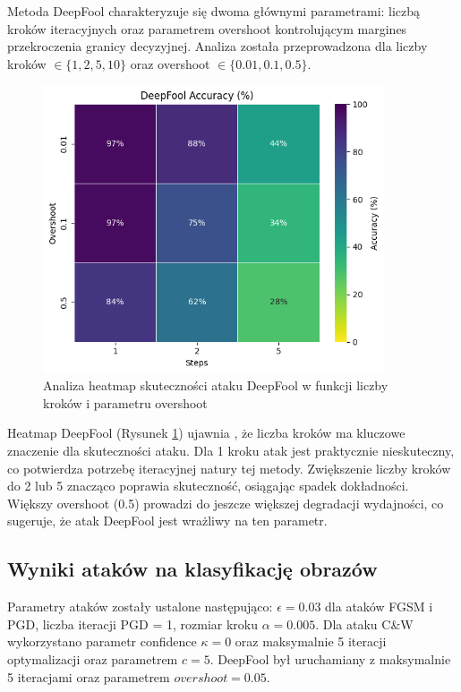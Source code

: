 \documentclass[12pt]{article}
\begin{document}
Metoda DeepFool charakteryzuje się dwoma głównymi parametrami: liczbą kroków iteracyjnych oraz parametrem overshoot kontrolującym margines przekroczenia granicy decyzyjnej. Analiza została przeprowadzona dla liczby kroków $\in \{1, 2, 5, 10\}$ oraz overshoot $\in \{0.01, 0.1, 0.5\}$.

\begin{figure}[H]
    \centering
    \includegraphics[width=0.9\textwidth]{deepfool_heatmap.png}
    \caption{Analiza heatmap skuteczności ataku DeepFool w funkcji liczby kroków i parametru overshoot}
    \label{fig:deepfool-heatmap}
\end{figure}

Heatmap DeepFool (Rysunek \ref{fig:deepfool-heatmap}) ujawnia , że liczba kroków ma kluczowe znaczenie dla skuteczności ataku. Dla 1 kroku atak jest praktycznie nieskuteczny, co potwierdza potrzebę iteracyjnej natury tej metody. Zwiększenie liczby kroków do 2 lub 5 znacząco poprawia skuteczność, osiągając spadek dokładności. Większy overshoot (0.5) prowadzi do jeszcze większej degradacji wydajności, co sugeruje, że atak DeepFool jest wrażliwy na ten parametr.

\subsection{Wyniki ataków na klasyfikację obrazów}

Parametry ataków zostały ustalone następująco: $\epsilon = 0.03$ dla ataków FGSM i PGD, liczba iteracji PGD = 1, rozmiar kroku $\alpha = 0.005$. Dla ataku C\&W wykorzystano parametr confidence $\kappa = 0$ oraz maksymalnie 5 iteracji optymalizacji oraz parametrem $c=5$. DeepFool był uruchamiany z maksymalnie 5 iteracjami oraz parametrem $overshoot=0.05$.
\end{document}
